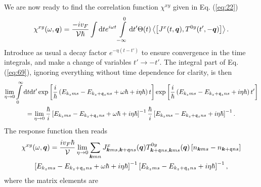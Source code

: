 We are now ready to find the correlation function $\chi ^{xy}$ given in Eq. (\ref{eq:22})
\begin{equation}
  \label{eq:69}
  \chi ^{xy}(\omega, \vec{q}) =
  \frac{-i v_F}{\mathcal{V} \hbar } 
  \int \mathrm{d}t e^{i \omega t} \int\limits_{-\infty }^0 \mathrm{d}t'
  \Theta (t)
  \Braket{\left[
J^x(t, \vec{q}), T^{0y}(t', -\vec{q})
    \right]}.
\end{equation}
Introduce as usual a decay factor $e^{-\eta (t-t')}$ to ensure convergence in the time integrals, and make a change of variables $t' \to -t'	$.
The integral part of Eq. (\ref{eq:69}), ignoring everything without time dependence for clarity, is then
\begin{multline}
  \lim_{\eta \to 0}
  \int\limits_{0}^{\infty } \mathrm{d}t \mathrm{d}t'
    \exp \left[ \frac{i}{\hbar } \left(
        E_{k_z m s} - E_{k_z+\mathfrak{q}_z ns} + \omega \hbar  + i \eta \hbar
      \right) t \right]
    \exp \left[ \frac{i}{\hbar } \left(
        E_{k_z m s} - E_{k_z+\mathfrak{q}_z ns} + i \eta \hbar
      \right) t' \right]\\
  =
  \lim_{\eta \to 0}\frac{\hbar}{i} \left[ E_{k_zms} - E_{k_z+\mathfrak{q}_z ns} + \omega \hbar  + i\eta \hbar  \right]^{-1}
\frac{\hbar}{i} \left[ E_{k_zms} - E_{k_z+\mathfrak{q}_z ns} + i \eta \hbar  \right]^{-1}.
\end{multline}
The response function then reads
\begin{multline}
  \chi ^{xy}(\omega , \bm{q}) =
  \frac{i v_F \hbar }{\mathcal{V} }
  \lim_{\eta \to 0}
  \sum\limits_{\bm{k}mn}^{}
  J^x_{\bm{k}ms, \bm{k}+\mathfrak{q}ns}(\bm{q})
  T^{0y}_{\bm{k}+\mathfrak{q}ns, \bm{k}ms}(\bm{q})
  \left[ n_{\bm{k}ms}- n_{\bm{k}+\mathfrak{q} ns} \right] \\
  \left[ E_{k_zms} - E_{k_z+\mathfrak{q}_z ns} + \omega \hbar  + i\eta \hbar  \right]^{-1}
  \left[ E_{k_zms} - E_{k_z+\mathfrak{q}_z ns} + i \eta \hbar  \right]^{-1},
\end{multline}
where the matrix elements are
